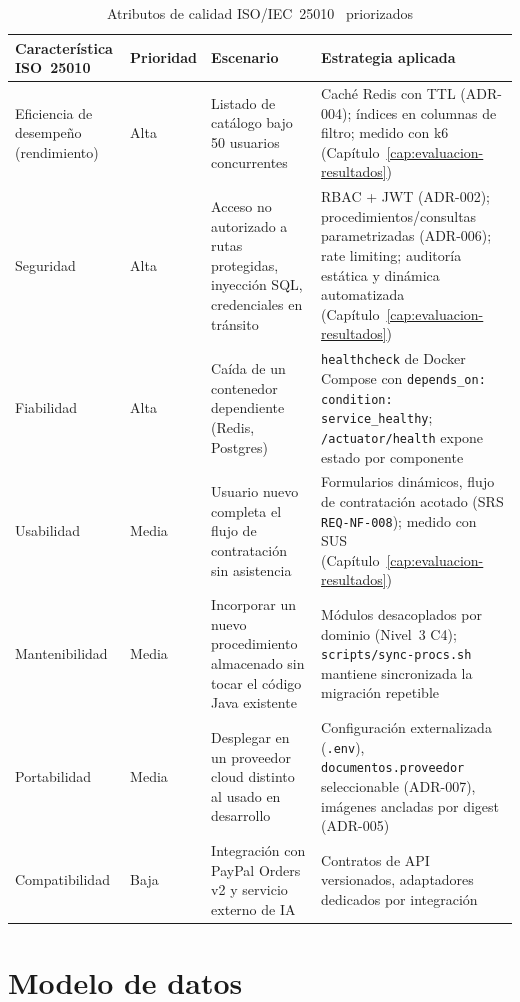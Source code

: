 \begin{table}[H]
\centering
\caption{Atributos de calidad ISO/IEC~25010~\cite{ISO25010} priorizados}
\label{tab:iso25010}
\begin{tabular}{@{}p{3.0cm}p{1.6cm}p{4.0cm}p{5.6cm}@{}}
\toprule
\textbf{Característica ISO~25010} & \textbf{Prioridad} & \textbf{Escenario} & \textbf{Estrategia aplicada} \\
\midrule
Eficiencia de desempeño (rendimiento) & Alta & Listado de catálogo bajo 50
  usuarios concurrentes & Caché Redis con TTL (ADR-004); índices en
  columnas de filtro; medido con k6 (Capítulo~\ref{cap:evaluacion-resultados}) \\
Seguridad & Alta & Acceso no autorizado a rutas protegidas, inyección
  SQL, credenciales en tránsito & RBAC + JWT (ADR-002);
  procedimientos/consultas parametrizadas (ADR-006); rate limiting;
  auditoría estática y dinámica automatizada
  (Capítulo~\ref{cap:evaluacion-resultados}) \\
Fiabilidad & Alta & Caída de un contenedor dependiente (Redis, Postgres) &
  \texttt{healthcheck} de Docker Compose con
  \texttt{depends\_on: condition: service\_healthy};
  \texttt{/actuator/health} expone estado por componente \\
Usabilidad & Media & Usuario nuevo completa el flujo de contratación sin
  asistencia & Formularios dinámicos, flujo de contratación acotado (SRS
  \texttt{REQ-NF-008}); medido con SUS
  (Capítulo~\ref{cap:evaluacion-resultados}) \\
Mantenibilidad & Media & Incorporar un nuevo procedimiento almacenado sin
  tocar el código Java existente & Módulos desacoplados por dominio
  (Nivel~3 C4); \texttt{scripts/sync-procs.sh} mantiene sincronizada la
  migración repetible \\
Portabilidad & Media & Desplegar en un proveedor cloud distinto al usado
  en desarrollo & Configuración externalizada (\texttt{.env}),
  \texttt{documentos.proveedor} seleccionable (ADR-007), imágenes ancladas
  por digest (ADR-005) \\
Compatibilidad & Baja & Integración con PayPal Orders v2 y servicio
  externo de IA & Contratos de API versionados, adaptadores dedicados por
  integración \\
\bottomrule
\end{tabular}
\end{table}

\section{Modelo de datos}

